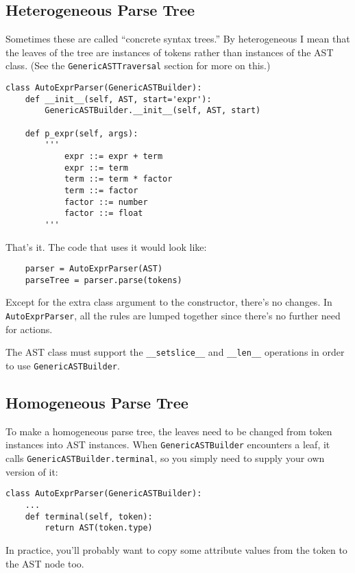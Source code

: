 \documentclass{article}
\newcommand{\code}[1]{\texttt{#1}}
\begin{document}
\subsection{Heterogeneous Parse Tree}

Sometimes these are called ``concrete syntax trees.''  By heterogeneous
I mean that the leaves of the tree are instances of tokens rather than
instances of the AST class.  (See the \code{GenericASTTraversal} section
for more on this.)

\begin{verbatim}
class AutoExprParser(GenericASTBuilder):
    def __init__(self, AST, start='expr'):
        GenericASTBuilder.__init__(self, AST, start)

    def p_expr(self, args):
        '''
            expr ::= expr + term
            expr ::= term
            term ::= term * factor
            term ::= factor
            factor ::= number
            factor ::= float
        '''
\end{verbatim}

That's it.  The code that uses it would look like:

\begin{verbatim}
    parser = AutoExprParser(AST)
    parseTree = parser.parse(tokens)
\end{verbatim}

Except for the extra class argument to the constructor, there's no
changes.  In \code{AutoExprParser}, all the rules are lumped together
since there's no further need for actions.

The AST class must support the \code{\_\_setslice\_\_} and \code{\_\_len\_\_}
operations in order to use \code{GenericASTBuilder}.

\subsection{Homogeneous Parse Tree}

To make a homogeneous parse tree, the leaves need to be changed from
token instances into AST instances.  When \code{GenericASTBuilder}
encounters a leaf, it calls \code{GenericASTBuilder.terminal}, so you
simply need to supply your own version of it:

\begin{verbatim}
class AutoExprParser(GenericASTBuilder):
    ...
    def terminal(self, token):
        return AST(token.type)
\end{verbatim}

In practice, you'll probably want to copy some attribute values from the
token to the AST node too.
\end{document}
